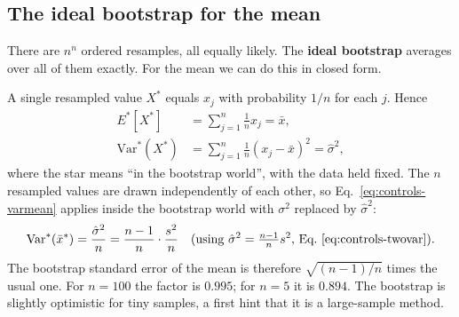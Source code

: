 \subsection{The ideal bootstrap for the mean}

There are $n^n$ ordered resamples, all equally likely. The \textbf{ideal bootstrap} averages over all of them exactly. For the mean we can do this in closed form.

A single resampled value $X^*$ equals $x_j$ with probability $1/n$ for each $j$. Hence
\begin{align}
E^*[X^*]&=\sum_{j=1}^n\frac1n x_j=\bar x,\label{eq:controls-bootmean}\\
\mathrm{Var}^*(X^*)&=\sum_{j=1}^n\frac1n(x_j-\bar x)^2=\hat\sigma^2,\label{eq:controls-bootvar1}
\end{align}
where the star means ``in the bootstrap world'', with the data held fixed. The $n$ resampled values are drawn independently of each other, so Eq.~\eqref{eq:controls-varmean} applies inside the bootstrap world with $\sigma^2$ replaced by $\hat\sigma^2$:
\begin{equation}
\mathrm{Var}^*(\bar x^*)=\frac{\hat\sigma^2}{n}=\frac{n-1}{n}\cdot\frac{s^2}{n}\quad\text{(using $\hat\sigma^2=\tfrac{n-1}{n}s^2$, Eq.~\eqref{eq:controls-twovar})}.
\label{eq:controls-bootvarmean}
\end{equation}
The bootstrap standard error of the mean is therefore $\sqrt{(n-1)/n}$ times the usual one. For $n=100$ the factor is $0.995$; for $n=5$ it is $0.894$. The bootstrap is slightly optimistic for tiny samples, a first hint that it is a large-sample method.

